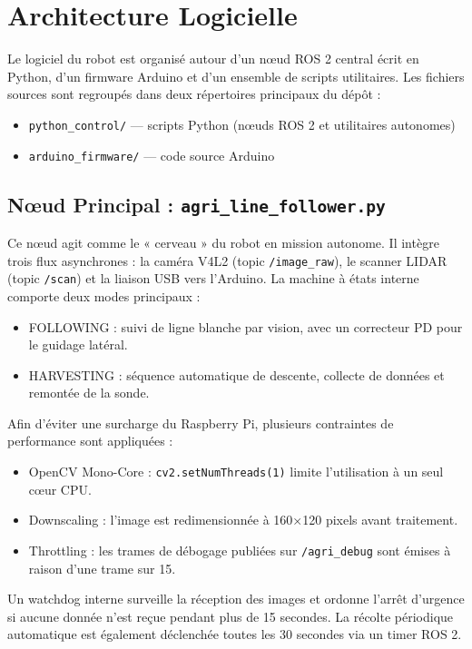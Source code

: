 \documentclass [12pt, a4paper]{article}
\begin{document}
\section{Architecture Logicielle}

Le logiciel du robot est organisé autour d'un nœud ROS 2 central écrit en Python, d'un firmware Arduino et d'un ensemble de scripts utilitaires. Les fichiers sources sont regroupés dans deux répertoires principaux du dépôt :
\begin{itemize}
    \item \texttt{python\_control/} — scripts Python (nœuds ROS 2 et utilitaires autonomes)
    \item \texttt{arduino\_firmware/} — code source Arduino
\end{itemize}

\subsection{Nœud Principal : \texttt{agri\_line\_follower.py}}
Ce nœud agit comme le « cerveau » du robot en mission autonome. Il intègre trois flux asynchrones : la caméra V4L2 (topic \texttt{/image\_raw}),
 le scanner LIDAR (topic \texttt{/scan}) et la liaison USB vers l'Arduino. La machine à états interne comporte deux modes principaux :
\begin{itemize}
    \item FOLLOWING : suivi de ligne blanche par vision, avec un correcteur PD pour le guidage latéral.
    \item HARVESTING : séquence automatique de descente, collecte de données et remontée de la sonde.
\end{itemize}
Afin d'éviter une surcharge du Raspberry Pi, plusieurs contraintes de performance sont appliquées :
\begin{itemize}
    \item OpenCV Mono-Core : \texttt{cv2.setNumThreads(1)} limite l'utilisation à un seul cœur CPU.
    \item Downscaling : l'image est redimensionnée à 160×120 pixels avant traitement.
    \item Throttling : les trames de débogage publiées sur \texttt{/agri\_debug} sont émises à raison d'une trame sur 15.
\end{itemize}
Un watchdog interne surveille la réception des images et ordonne l'arrêt d'urgence si aucune donnée n'est reçue pendant plus de 15 secondes. La récolte périodique automatique est également déclenchée toutes les 30 secondes via un timer ROS 2.
\end{document}
